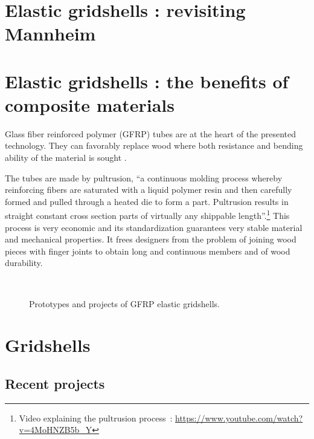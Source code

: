 \section{Elastic gridshells : revisiting Mannheim}


\section{Elastic gridshells : the benefits of composite materials}

Glass fiber reinforced polymer (GFRP) tubes are at the heart of the presented technology. They can favorably replace wood where both resistance and bending ability of the material is sought \cite{Douthe2010}. 

The tubes are made by pultrusion, \enquote{a continuous molding process whereby reinforcing fibers are saturated with a liquid polymer resin and then carefully formed and pulled through a heated die to form a part. Pultrusion results in straight constant cross section parts of virtually any shippable length}.\footnote{Video explaining the pultrusion process~: \url{https://www.youtube.com/watch?v=4MoHNZB5b_Y}} This process is very economic and its standardization guarantees very stable material and mechanical properties. It frees designers from the problem of joining wood pieces with finger joints to obtain long and continuous members and of wood durability.

\begin{figure}[h]
	\centering
		\captionsetup[subfloat]{captionskip=10pt}
		\\ \vspace{1cm}
		\vspace{10pt}
		\caption{Prototypes and projects of GFRP elastic gridshells.}
		\label{fig:proto}    
\end{figure}

\section{Gridshells}

\subsection{Recent projects}

